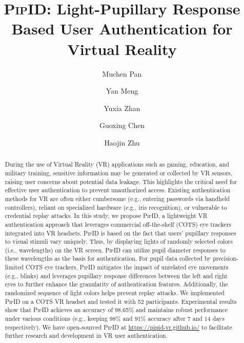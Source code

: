 \documentclass[sigconf]{acmart}
\newcommand{\sysname}{\textsc{PipID}\xspace}
\begin{document}
\title{\sysname: Light-Pupillary Response Based User Authentication for Virtual Reality}

\author{Muchen Pan}

\author{Yan Meng}

\author{Yuxia Zhan}


\author{Guoxing Chen}


\author{Haojin Zhu}

\renewcommand{\shortauthors}{Muchen Pan et al.}

\begin{abstract}
During the use of Virtual Reality (VR) applications such as gaming, education, and military training, sensitive information may be generated or collected by VR sensors, raising user concerns about potential data leakage. This highlights the critical need for effective user authentication to prevent unauthorized access. Existing authentication methods for VR are often either cumbersome (e.g., entering passwords via handheld controllers), reliant on specialized hardware (e.g., iris recognition), or vulnerable to credential replay attacks.
In this study, we propose \sysname, a lightweight VR authentication approach that leverages commercial off-the-shelf (COTS) eye trackers integrated into VR headsets. \sysname is based on the fact that users' pupillary responses to visual stimuli vary uniquely. Thus, by displaying lights of randomly selected colors (i.e., wavelengths) on the VR screen, \sysname can utilize pupil diameter responses to these wavelengths as the basis for authentication. For pupil data collected by precision-limited COTS eye trackers, \sysname mitigates the impact of unrelated eye movements (e.g., blinks) and leverages pupillary response differences between the left and right eyes to further enhance the granularity of authentication features. Additionally, the randomized sequence of light colors helps prevent replay attacks. We implemented \sysname on a COTS VR headset and tested it with 52 participants.
Experimental results show that \sysname achieves an accuracy of 98.65\% and maintains robust performance under various conditions (e.g., keeping 98\% and 91\% accuracy after 7 and 14 days respectively). We have open-sourced \sysname at \url{https://pipid-vr.github.io/} to facilitate further research and development in VR user authentication.

\end{abstract}
\end{document}
